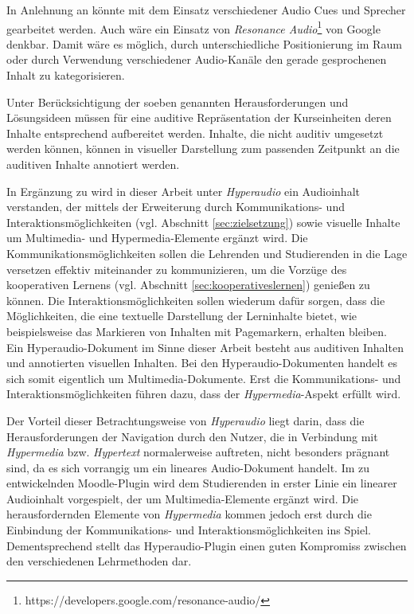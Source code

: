In Anlehnung an \cite{donker2007gestaltung} könnte mit dem Einsatz verschiedener Audio Cues und Sprecher gearbeitet werden. Auch wäre ein Einsatz von \textit{Resonance Audio}\footnote{https://developers.google.com/resonance-audio/} von Google denkbar. Damit wäre es möglich, durch unterschiedliche Positionierung im Raum oder durch Verwendung verschiedener Audio-Kanäle den gerade gesprochenen Inhalt zu kategorisieren. 


Unter Berücksichtigung der soeben genannten Herausforderungen und Lösungsideen müssen für eine auditive Repräsentation der Kurseinheiten deren Inhalte entsprechend aufbereitet werden. Inhalte, die nicht auditiv umgesetzt werden können, können in visueller Darstellung zum passenden Zeitpunkt an die auditiven Inhalte annotiert werden.

In Ergänzung zu \cite{zumbach2006learning} wird in dieser Arbeit unter \textit{Hyperaudio} ein Audioinhalt verstanden, der mittels der Erweiterung durch Kommunikations- und Interaktionsmöglichkeiten (vgl. Abschnitt \ref{sec:zielsetzung}) sowie visuelle Inhalte um Multimedia- und Hypermedia-Elemente ergänzt wird. Die Kommunikationsmöglichkeiten sollen die Lehrenden und Studierenden in die Lage versetzen effektiv miteinander zu kommunizieren, um die Vorzüge des kooperativen Lernens (vgl. Abschnitt \ref{sec:kooperativeslernen}) genießen zu können. Die Interaktionsmöglichkeiten sollen wiederum dafür sorgen, dass die Möglichkeiten, die eine textuelle Darstellung der Lerninhalte bietet, wie beispielsweise das Markieren von Inhalten mit Pagemarkern, erhalten bleiben.\\
Ein Hyperaudio-Dokument im Sinne dieser Arbeit besteht aus auditiven Inhalten und annotierten visuellen Inhalten. Bei den Hyperaudio-Dokumenten handelt es sich somit eigentlich um Multimedia-Dokumente. Erst die Kommunikations- und Interaktionsmöglichkeiten führen dazu, dass der \textit{Hypermedia}-Aspekt erfüllt wird.

Der Vorteil dieser Betrachtungsweise von \textit{Hyperaudio} liegt darin, dass die Herausforderungen der Navigation durch den Nutzer, die in Verbindung mit \textit{Hypermedia} bzw. \textit{Hypertext} normalerweise auftreten, nicht besonders prägnant sind, da es sich vorrangig um ein lineares Audio-Dokument handelt. Im zu entwickelnden Moodle-Plugin wird dem Studierenden in erster Linie ein linearer Audioinhalt vorgespielt, der um Multimedia-Elemente ergänzt wird. Die herausfordernden Elemente von \textit{Hypermedia} kommen jedoch erst durch die Einbindung der Kommunikations- und Interaktionsmöglichkeiten ins Spiel. Dementsprechend stellt das Hyperaudio-Plugin einen guten Kompromiss zwischen den verschiedenen Lehrmethoden dar.

